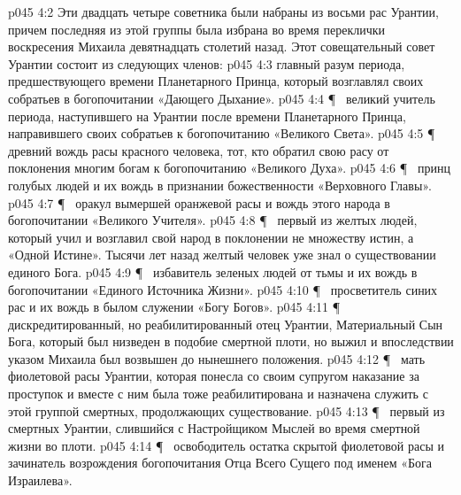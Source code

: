 \vs p045 4:2 Эти двадцать четыре советника были набраны из восьми рас Урантии, причем последняя из этой группы была избрана во время переклички воскресения Михаила девятнадцать столетий назад. Этот совещательный совет Урантии состоит из следующих членов:
\vs p045 4:3 \bibnobreakspace {} главный разум периода, предшествующего времени Планетарного Принца, который возглавлял своих собратьев в богопочитании «Дающего Дыхание».
\vs p045 4:4 \P\ \bibnobreakspace {} великий учитель периода, наступившего на Урантии после времени Планетарного Принца, направившего своих собратьев к богопочитанию «Великого Света».
\vs p045 4:5 \P\ \bibnobreakspace {} древний вождь расы красного человека, тот, кто обратил свою расу от поклонения многим богам к богопочитанию «Великого Духа».
\vs p045 4:6 \P\ \bibnobreakspace {} принц голубых людей и их вождь в признании божественности «Верховного Главы».
\vs p045 4:7 \P\ \bibnobreakspace {} оракул вымершей оранжевой расы и вождь этого народа в богопочитании «Великого Учителя».
\vs p045 4:8 \P\ \bibnobreakspace {} первый из желтых людей, который учил и возглавил свой народ в поклонении не множеству истин, а «Одной Истине». Тысячи лет назад желтый человек уже знал о существовании единого Бога.
\vs p045 4:9 \P\ \bibnobreakspace {} избавитель зеленых людей от тьмы и их вождь в богопочитании «Единого Источника Жизни».
\vs p045 4:10 \P\ \bibnobreakspace {} просветитель синих рас и их вождь в былом служении «Богу Богов».
\vs p045 4:11 \P\ \bibnobreakspace {} дискредитированный, но реабилитированный отец Урантии, Материальный Сын Бога, который был низведен в подобие смертной плоти, но выжил и впоследствии указом Михаила был возвышен до нынешнего положения.
\vs p045 4:12 \P\ \bibnobreakspace {} мать фиолетовой расы Урантии, которая понесла со своим супругом наказание за проступок и вместе с ним была тоже реабилитирована и назначена служить с этой группой смертных, продолжающих существование.
\vs p045 4:13 \P\ \bibnobreakspace {} первый из смертных Урантии, слившийся с Настройщиком Мыслей во время смертной жизни во плоти.
\vs p045 4:14 \P\ \bibnobreakspace {} освободитель остатка скрытой фиолетовой расы и зачинатель возрождения богопочитания Отца Всего Сущего под именем «Бога Израилева».
